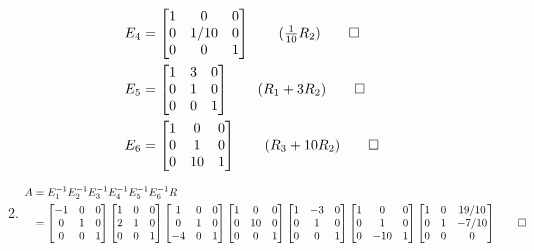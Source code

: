 \documentclass[12pt, a4paper]{article}
\begin{document}
\begin{enumerate}[Q\arabic*.]
\begin{enumerate}[label=(b\roman*)]
\begin{align*}
          E_4 &= \begin{bmatrix}1&0&0\\0&1/10&0\\0&0&1\end{bmatrix}\tag*{($\frac{1}{10}R_2$)} \qed\\
          E_5 &= \begin{bmatrix}1&3&0\\0&1&0\\0&0&1\end{bmatrix}\tag*{($R_1+3R_2$)} \qed\\
          E_6 &= \begin{bmatrix}1&0&0\\0&1&0\\0&10&1\end{bmatrix}\tag*{($R_3+10R_2$)} \qed\\
        \end{align*}
      \item \begin{align*}
          A &= E_1^{-1}E_2^{-1}E_3^{-1}E_4^{-1}E_5^{-1}E_6^{-1}R\\
            &= \begin{bmatrix}-1&0&0\\0&1&0\\0&0&1\end{bmatrix} \begin{bmatrix}1&0&0\\2&1&0\\0&0&1\end{bmatrix}  \begin{bmatrix}1&0&0\\0&1&0\\-4&0&1\end{bmatrix}  \begin{bmatrix}1&0&0\\0&10&0\\0&0&1\end{bmatrix}  \begin{bmatrix}1&-3&0\\0&1&0\\0&0&1\end{bmatrix}  \begin{bmatrix}1&0&0\\0&1&0\\0&-10&1\end{bmatrix}  \begin{bmatrix}1&0&19/10\\0&1&-7/10\\0&0&0\end{bmatrix} \qed
        \end{align*}
    \end{enumerate}


\end{enumerate}
\end{document}
